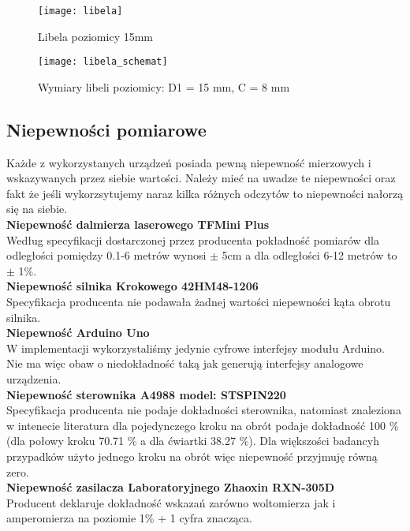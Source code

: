 \begin{figure}[h]
    \centering
    \texttt{[image: libela]}
    \caption{Libela poziomicy 15mm}
    \label{fig:libela}
\end{figure}

\begin{figure}[h]
    \centering
    \texttt{[image: libela\_schemat]}
    \caption{Wymiary libeli poziomicy: D1 = 15 mm, C = 8 mm}
    \label{fig:libela_schemat}
\end{figure} 

\subsection {Niepewności pomiarowe}
Każde z wykorzystanych urządzeń posiada pewną niepewność mierzowych i wskazywanych przez siebie wartości. Należy mieć na uwadze te niepewności oraz fakt że jeśli wykorzsytujemy naraz kilka różnych odczytów to niepewności nałorzą się na siebie.\\

\textbf{Niepewność dalmierza laserowego TFMini Plus}\\
Według specyfikacji dostarczonej przez producenta pokładność pomiarów dla odległości pomiędzy 0.1-6 metrów wynosi $\pm$ 5cm a dla odległości 6-12 metrów to $\pm$ 1\%.\\

\textbf{Niepewność silnika Krokowego 42HM48-1206}\\
Specyfikacja producenta nie podawała żadnej wartości niepewności kąta obrotu silnika.\\

\textbf{Niepewność Arduino Uno}\\
W implementacji wykorzystaliśmy jedynie cyfrowe interfejsy modułu Arduino. Nie ma więc obaw o niedokładność taką jak generują interfejsy analogowe urządzenia.\\

\textbf{Niepewność sterownika A4988 model: STSPIN220}\\
Specyfikacja producenta nie podaje dokładności sterownika, natomiast znaleziona w intenecie literatura \cite{microstepping} dla pojedynczego kroku na obrót podaje dokładność 100 \% (dla połowy kroku 70.71 \% a dla ćwiartki 38.27 \%). Dla większości badancyh przypadków użyto jednego kroku na obrót więc niepewność przyjmuję równą zero.\\

\textbf{Niepewność zasilacza Laboratoryjnego Zhaoxin RXN-305D}\\
Producent deklaruje dokładność wskazań zarówno woltomierza jak i amperomierza na poziomie 1\% + 1 cyfra znacząca.\\

